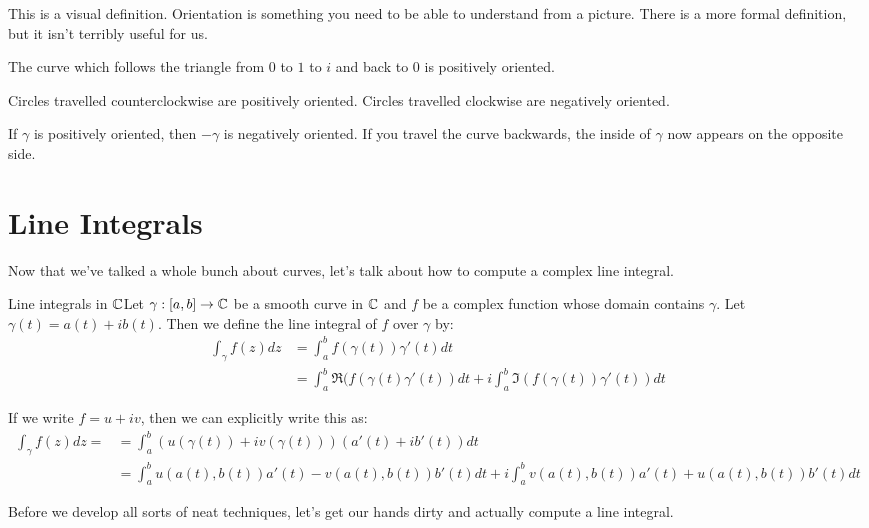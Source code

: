This is a visual definition. Orientation is something you need to be able to understand from a picture. There is a more formal definition, but it isn't terribly useful for us.

\begin{ex}{}{} The curve which follows the triangle from $0$ to $1$ to $i$ and back to $0$ is positively oriented.

Circles travelled counterclockwise are positively oriented. Circles travelled clockwise are negatively oriented.

\end{ex}

\begin{ex}{}{} If $\gamma$ is positively oriented, then $-\gamma$ is negatively oriented. If you travel the curve backwards, the inside of $\gamma$ now appears on the opposite side.
\end{ex}

\section{Line Integrals}

Now that we've talked a whole bunch about curves, let's talk about how to compute a complex line integral.

\begin{defbo}{Line integrals in $\mathbb{C}$}{}Let $\gamma:[a,b]\rightarrow \mathbb{C}$ be a smooth curve in $\mathbb{C}$ and $f$ be a complex function whose domain contains $\gamma$. Let $\gamma(t) = a(t) + ib(t)$. Then we define the line integral of $f$ over $\gamma$ by:
\begin{align*}\int_{\gamma} f(z)dz 	&= \int_{a}^b f(\gamma(t))\gamma'(t)dt\\
						     	&= \int_{a}^b \Re(f(\gamma(t)\gamma'(t))dt + i\int_{a}^b \Im(f(\gamma(t))\gamma'(t))dt
\end{align*}

If we write $f = u+iv$, then we can explicitly write this as:
\begin{align*}
	\int_{\gamma} f(z)dz = 
	&= \int_{a}^{b} (u(\gamma(t)) + iv(\gamma(t)))(a'(t) + ib'(t))dt\\
	&= \int_{a}^b u(a(t),b(t))a'(t) - v(a(t),b(t))b'(t)dt + i \int_{a}^b v(a(t),b(t))a'(t) + u(a(t),b(t))b'(t)dt
\end{align*}
\end{defbo}

Before we develop all sorts of neat techniques, let's get our hands dirty and actually compute a line integral.

